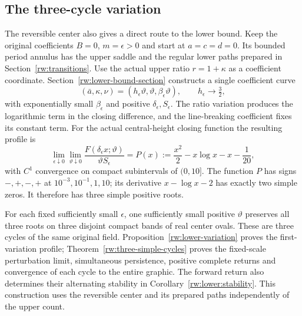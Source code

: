 \subsection{The three-cycle variation}
\label{rw:lower:preview}

The reversible center also gives a direct route to the lower bound.
Keep the original coefficients $B=0$, $m=\epsilon>0$ and start at
$a=c=d=0$. Its bounded period annulus has the upper saddle and the
regular lower paths prepared in Section~\ref{rw:transitions}.
Use the actual upper ratio $r=1+\kappa$ as a coefficient coordinate.
Section~\ref{rw:lower-bound-section} constructs a single coefficient
curve
\[
 (\bar a,\kappa,\nu)
       =(h_\epsilon\vartheta,\vartheta,\beta_\epsilon\vartheta),
 \qquad h_\epsilon\longrightarrow\tfrac32,
\]
with exponentially small $\beta_\epsilon$ and positive
$\delta_\epsilon,S_\epsilon$. The ratio variation produces the
logarithmic term in the closing difference, and the line-breaking
coefficient fixes its constant term. For the actual central-height
closing function the resulting profile is
\[
 \lim_{\epsilon\downarrow0}\lim_{\vartheta\downarrow0}
 \frac{F(\delta_\epsilon x;\vartheta)}{\vartheta S_\epsilon}
 =P(x):=\frac{x^2}{2}-x\log x-x-\frac1{20},
\]
with $C^1$ convergence on compact subintervals of $(0,10]$.
The function $P$ has signs $-,+,-,+$ at $10^{-3},10^{-1},1,10$;
its derivative $x-\log x-2$ has exactly two simple zeros.
It therefore has three simple positive roots.

For each fixed sufficiently small $\epsilon$, one sufficiently small
positive $\vartheta$ preserves all three roots on three disjoint
compact bands of real center ovals. These are three cycles of the
same original field. Proposition~\ref{rw:lower-variation} proves
the first-variation profile; Theorem~\ref{rw:three-simple-cycles}
proves the fixed-scale perturbation limit, simultaneous persistence,
positive complete returns and convergence of each cycle to the entire
graphic.
The forward return also determines their alternating stability in
Corollary~\ref{rw:lower:stability}. This construction uses the
reversible center and its prepared paths independently of the upper
count.
